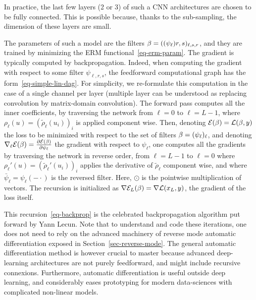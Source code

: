 In practice, the last few layers (2 or 3) of such a CNN architectures are chosen to be fully connected. This is possible because, thanks to the sub-sampling, the dimension of these layers are small.  

The parameters of such a model are the filters $\beta = ( (\psi_\ell){r,s})_{\ell,s,r}$, and they are trained by minimizing the ERM functional~\eqref{eq-erm-param}. The gradient is typically computed by backpropagation. Indeed, when computing the gradient with respect to some filter $\psi_{\ell,r,s}$, the feedforward computational graph has the form~\eqref{eq-simple-lin-dag}. For simplicity, we re-formulate this computation in the case of a single channel per layer (multiple layer can be understood as replacing convolution by matrix-domain convolution). The forward pass computes all the inner coefficients, by traversing the network from $\ell=0$ to $\ell=L-1$, 
where $\rho_\ell(u)=(\tilde\rho_\ell(u_i))_i$ is applied component wise. Then, denoting $\mathcal{E}(\beta) = \mathcal{L}( \beta,y )$ the loss to be minimized with respect to the set of filters $\beta=(\psi_\ell)_\ell$, and denoting $\nabla_\ell \mathcal{E}(\beta) = \frac{ \partial \mathcal{E}( \beta )}{\partial \psi_\ell}$ the gradient with respect to $\psi_\ell$, one computes all the gradients by traversing the network in reverse order, from $\ell=L-1$ to $\ell=0$
where $\rho_\ell'(u)=( \tilde\rho_\ell'( u_i ) )_i$ applies the derivative of $\tilde\rho_\ell$ component wise, and where $\bar \psi_{\ell} = \psi_\ell(-\cdot)$ is the reversed filter. Here, $\odot$ is the pointwise multiplication of vectors.
%
The recursion is initialized as $\nabla \mathcal{E}_L(\beta) = \nabla \mathcal{L}(x_L,y)$, the gradient of the loss itself. 

This recursion~\eqref{eq-backprop} is the celebrated backpropagation algorithm put forward by Yann Lecun. Note that to understand and code these iterations, one does not need to rely on the advanced machinery of reverse mode automatic differentiation exposed in Section~\ref{sec-reverse-mode}. The general automatic differentiation method is however crucial to master because advanced deep-learning architectures are not purely feedforward, and might include recursive connexions. Furthermore, automatic differentiation is useful outside deep learning, and considerably eases prototyping for modern data-sciences with complicated non-linear models.  


